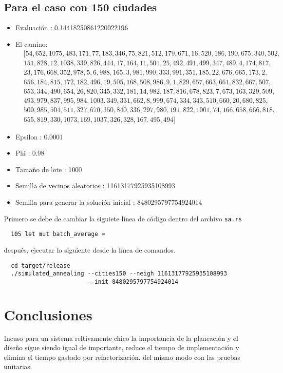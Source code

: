 \documentclass[a4paper]{article}
\begin{document}
\subsection*{Para el caso con 150 ciudades}
\begin{itemize}
\item Evaluaci\'on : 0.14418250861220022196
\item El camino:
  \begin{align*}
    &[54, 652, 1075, 483, 171, 77, 183, 346, 75, 821, 512, 179, 671, 16, 520, 186, 190, 675, 340, 502,\\
    &151, 828, 12, 1038, 339, 826, 444, 17, 164, 11, 501, 25, 492, 491, 499, 347, 489, 4, 174, 817,\\
    &23, 176, 668, 352, 978, 5, 6, 988, 165, 3, 981, 990, 333, 991, 351, 185, 22, 676, 665, 173, 2,\\
    &656, 184, 815, 172, 182, 496, 19, 505, 168, 508, 986, 9, 1, 829, 657, 663, 661, 832, 667, 507,\\
    &653, 344, 490, 654, 26, 820, 345, 332, 181, 14, 982, 187, 816, 678, 823, 7, 673, 163, 329, 509,\\
    &493, 979, 837, 995, 984, 1003, 349, 331, 662, 8, 999, 674, 334, 343, 510, 660, 20, 680, 825,\\
    &500, 985, 504, 511, 327, 670, 350, 840, 336, 297, 980, 191, 822, 1001, 74, 166, 658, 666, 818,\\
    &655, 819, 330, 1073, 169, 1037, 326, 328, 167, 495, 494]
  \end{align*}
  
\item Epsilon : 0.0001
\item Phi : 0.98
\item Tamaño de lote : 1000
\item Semilla de vecinos aleatorios : 11613177925935108993
\item Semilla para generar la soluci\'on inicial : 8480295797754924014
\end{itemize}
Primero se debe de cambiar la siguiete l\'inea de c\'odigo dentro del archivo \texttt{sa.rs}
\begin{lstlisting}
  105 let mut batch_average = 
\end{lstlisting}

despu\'es, ejecutar lo siguiente desde la l\'inea de comandos.
\begin{lstlisting}
  cd target/release
  ./simulated_annealing --cities150 --neigh 11613177925935108993
                        --init 8480295797754924014
                      \end{lstlisting}



%
\section*{Conclusiones}
Incuso para un sistema reltivamente chico la importancia de la planeaci\'on y el diseño  sigue siendo igual de importante, reduce el tiempo de implementaci\'on y elimina el tiempo gastado por refactorizaci\'on, del mismo modo con las pruebas unitarias.   


{}

\end{document}
